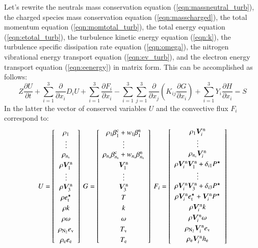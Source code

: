 \documentclass{warpdoc}
\newcommand{\alb}{\vspace{0.1cm}\\} %
\newcommand{\ns}{{n_{\rm s}}}
\renewcommand{\vec}[1]{\bm{#1}}
\begin{document}
Let's rewrite the neutrals mass conservation equation (\ref{eqn:massneutral_turb}), the charged species mass conservation equation (\ref{eqn:masscharged}), the total momentum equation (\ref{eqn:momtotal_turb}), the total energy equation (\ref{eqn:etotal_turb}), the turbulence kinetic energy equation (\ref{eqn:k}), the turbulence specific dissipation rate equation (\ref{eqn:omega}), the nitrogen vibrational energy transport equation (\ref{eqn:ev_turb}), and the electron energy transport equation (\ref{eqn:eenergy}) in matrix form. This can be accomplished as follows:
%
\begin{equation}
   Z\frac{\partial U}{\partial t} + \sum_{i=1}^3  \frac{\partial }{\partial x_i} D_i U
   + \sum_{i=1}^3 \frac{\partial F_i}{\partial x_i} 
     - \sum_{i=1}^3 \sum_{j=1}^3 \frac{\partial }{\partial x_j}\left( K_{ij} \frac{\partial G}{\partial x_i} \right)
     +\sum_{i=1}^3 Y_i \frac{\partial H}{\partial x_i}  
   =S
\end{equation}
%
In the latter the vector of conserved variables $U$ and the convective flux $F_i$ correspond to:
%
\begin{equation}
U = \left[\begin{array}{c}
    \rho_1 \\
    \vdots \\
    \rho_\ns \alb
    \rho \vec{V}^{\rm n}_1 \\
    \vdots \\
    \rho \vec{V}^{\rm n}_3 \alb
    \rho e_{\rm t}^\star \alb
    \rho k \alb
    \rho \omega \alb
    \rho_{\rm N_2} e_{\rm v} \alb
    \rho_{\rm e} e_{\rm e} \end{array}\right]
~
G = \left[ \begin{array}{c}
    \rho_1 \beta^{\rm c}_1 + w_1 \beta^{\rm n}_1 \\
    \vdots \\
    \rho_\ns \beta^{\rm c}_\ns + w_\ns \beta^{\rm n}_\ns \alb
    \vec{V}_1^{\rm n} \\
    \vdots\\
    \vec{V}_3^{\rm n} \alb
    T \alb
    k \alb
    \omega \alb
    T_{\rm v} \alb
    T_{\rm e}
\end{array}
\right]
~
F_i = \left[ \begin{array}{c}
    \rho_1 \vec{V}^{\rm n}_i \\
    \vdots\\
    \rho_\ns \vec{V}^{\rm n}_i \alb
    \rho\vec{V}_i^{\rm n} \vec{V}_1^{\rm n} + \delta_{i1} P^\star \\
    \vdots \\
    \rho\vec{V}_i^{\rm n} \vec{V}_3^{\rm n}  + \delta_{i3} P^\star \alb
    \rho \vec{V}^{\rm n}_i e_{\rm t}^\star + \vec{V}^{\rm n}_i P^\star \alb
    \rho \vec{V}^{\rm n}_i k \alb
    \rho \vec{V}^{\rm n}_i \omega \alb
    \rho_{\rm N_2} \vec{V}^{\rm n}_i e_{\rm v} \alb
    \rho_{\rm e} \vec{V}^{\rm n}_i h_{\rm e} \alb
\end{array}\right]
\end{equation}
\end{document}
